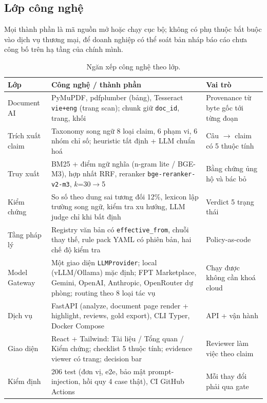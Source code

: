 \documentclass[11pt,a4paper]{article}
\newcommand{\code}[1]{\texttt{#1}}
\begin{document}
\subsection{Lớp công nghệ}

Mọi thành phần là mã nguồn mở hoặc chạy cục bộ; không có phụ thuộc bắt buộc vào dịch vụ thương mại, để doanh nghiệp có thể soát bản nháp báo cáo chưa công bố trên hạ tầng của chính mình.

\begin{table}[!htbp]\small
\begin{tabularx}{\linewidth}{L{3.2cm} X L{3.6cm}}
\toprule
\textbf{Lớp} & \textbf{Công nghệ / thành phần} & \textbf{Vai trò} \\
\midrule
Document AI & PyMuPDF, pdfplumber (bảng), Tesseract \code{vie+eng} (trang scan); chunk giữ \code{doc\_id}, trang, khối & Provenance từ byte gốc tới từng đoạn \\
Trích xuất claim & Taxonomy song ngữ 8 loại claim, 6 phạm vi, 6 nhóm chỉ số; heuristic tất định + LLM chuẩn hoá & Câu $\to$ claim có 5 thuộc tính \\
Truy xuất & BM25 + điểm ngữ nghĩa (n-gram lite / BGE-M3), hợp nhất RRF, reranker \code{bge-reranker-v2-m3}, $k$=30$\to$5 & Bằng chứng ủng hộ và bác bỏ \\
Kiểm chứng & So số theo dung sai tương đối 12\%, lexicon lập trường song ngữ, kiểm tra xu hướng, LLM judge chỉ khi bất định & Verdict 5 trạng thái \\
Tầng pháp lý & Registry văn bản có \code{effective\_from}, chuỗi thay thế, rule pack YAML có phiên bản, hai chế độ kiểm tra & Policy-as-code \\
Model Gateway & Một giao diện \code{LLMProvider}; local (vLLM/Ollama) mặc định; FPT Marketplace, Gemini, OpenAI, Anthropic, OpenRouter dự phòng; routing theo 8 loại tác vụ & Chạy được không cần khoá cloud \\
Dịch vụ & FastAPI (analyze, document page render + highlight, reviews, gold export), CLI Typer, Docker Compose & API + vận hành \\
Giao diện & React + Tailwind: Tài liệu / Tổng quan / Kiểm chứng; checklist 5 thuộc tính; evidence viewer có trang; decision bar & Reviewer làm việc theo claim \\
Kiểm định & 206 test (đơn vị, e2e, bảo mật prompt-injection, hồi quy 4 case thật), CI GitHub Actions & Mỗi thay đổi phải qua gate \\
\bottomrule
\end{tabularx}
\caption{Ngăn xếp công nghệ theo lớp.}
\end{table}
\end{document}
